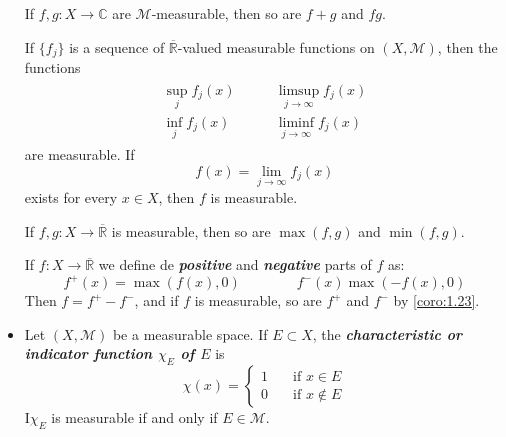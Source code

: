 \documentclass{article}
\theoremstyle{definition}
\numberwithin{equation}{section}
\newcommand{\R}{\mathbb{R}}
\newcommand{\C}{\mathbb{C}}
\begin{document}
\begin{itemize}
		\begin{prop}
			If $f,g:X\to\C$ are $\mathcal{M}$-measurable, then so are $f+g$ and $fg$.
		\end{prop}
		\begin{prop}
			If $\{f_j\}$ is a sequence of $\overline{\R}$-valued measurable functions on $(X,\mathcal{M})$, then the functions
			\begin{align*}
				\begin{aligned}
					\sup_jf_j(x)\\
					\inf_jf_j(x)
				\end{aligned}\qquad
				\begin{aligned}
					\limsup_{j\to\infty}f_j(x)\\
					\liminf_{j\to\infty}f_j(x)
				\end{aligned}
			\end{align*}
			are measurable. If
			\[f(x)=\lim_{j\to\infty}f_j(x)\]
			exists for every $x\in X$, then $f$ is measurable.
		\end{prop}
		\begin{coro}\label{coro:1.23}
			If $f,g:X\to\overline{\R}$ is measurable, then so are $\max(f,g)$ and $\min(f,g)$.
		\end{coro}
		If $f:X\to\overline{\R}$ we define de \textbf{\textit{positive}} and \textbf{\textit{negative}} parts of $f$ as:
		\[f^+(x)=\max(f(x),0)\qquad\qquad f^-(x)\max(-f(x),0)\]
		Then $f=f^+-f^-$, and if $f$ is measurable, so are $f^+$ and $f^-$ by \cref{coro:1.23}.
		
		\item Let $(X,\mathcal{M})$ be a measurable space. If $E\subset X$, the \textbf{\textit{characteristic or indicator function $\chi_E$ of $E$}} is
		\[\chi(x)=\begin{cases}
			1\quad&\text{if }x\in E\\
			0\quad&\text{if }x\notin E
		\end{cases}\]
		I$\chi_E$ is measurable if and only if $E\in\mathcal{M}$.
		

\end{itemize}
\end{document}
